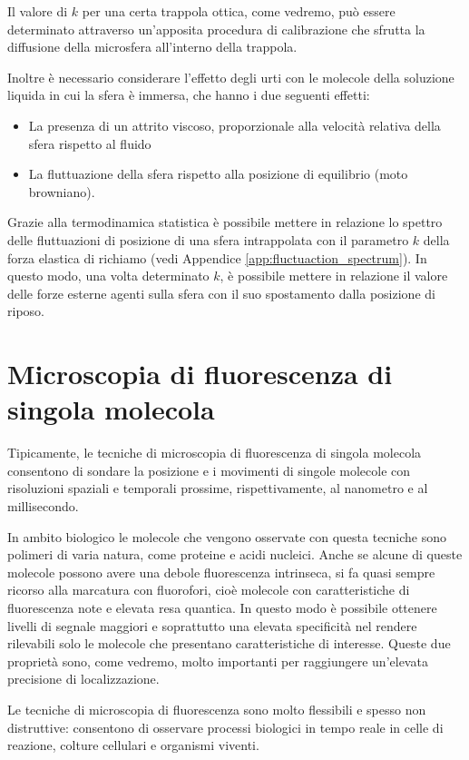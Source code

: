 Il valore di $k$ per una certa trappola ottica, come vedremo, può
essere determinato attraverso un'apposita procedura di calibrazione
che sfrutta la diffusione della microsfera all'interno della trappola.

Inoltre è necessario considerare l'effetto degli urti con le molecole
della soluzione liquida in cui la sfera è immersa, che hanno i due
seguenti effetti:
\begin{itemize}
    \item La presenza di un attrito viscoso, proporzionale alla
        velocità relativa della sfera rispetto al fluido
    \item La fluttuazione della sfera rispetto alla posizione di
        equilibrio (moto browniano).
\end{itemize}

Grazie alla termodinamica statistica è possibile mettere in relazione
lo spettro delle fluttuazioni di posizione di una sfera intrappolata
con il parametro $k$ della forza elastica di richiamo
(vedi Appendice \ref{app:fluctuaction_spectrum}).
In questo modo, una volta determinato $k$, è possibile mettere
in relazione il valore delle forze esterne agenti sulla sfera con il
suo spostamento dalla posizione di riposo.


\section{Microscopia di fluorescenza di singola molecola}
\label{sec:fluo}

Tipicamente, le tecniche di microscopia di fluorescenza di singola
molecola consentono di sondare la posizione e i movimenti di singole
molecole con risoluzioni spaziali e temporali prossime,
rispettivamente, al nanometro e al millisecondo.

In ambito biologico le molecole che vengono osservate con questa
tecniche sono polimeri di varia natura, come proteine e acidi
nucleici. Anche se alcune di queste molecole possono avere una
debole fluorescenza intrinseca, si fa quasi sempre ricorso alla
marcatura con fluorofori, cioè molecole con caratteristiche di
fluorescenza note e elevata resa quantica. In questo modo è
possibile ottenere livelli di segnale maggiori e soprattutto 
una elevata specificità nel rendere rilevabili solo le molecole
che presentano caratteristiche di interesse.
Queste due proprietà sono, come vedremo, molto importanti per
raggiungere un'elevata precisione di localizzazione.

Le tecniche di microscopia di fluorescenza sono molto flessibili
e spesso non distruttive: consentono di osservare processi biologici
in tempo reale in celle di reazione, colture cellulari e organismi
viventi.

